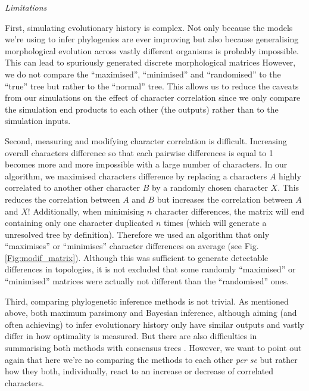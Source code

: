 \documentclass[12pt,letterpaper]{article}
\renewcommand{\subsection}[1]{%
\bigskip
\begin{center}
\begin{large}
\normalfont\itshape #1
\end{large}
\end{center}}
\begin{document}
\subsection{Limitations}
First, simulating evolutionary history is complex.
Not only because the models we're using to infer phylogenies are ever improving \citep[e.g.][]{heath2014fossilized,Wright01072016} but also because generalising morphological evolution across vastly different organisms is probably impossible.
This can lead to spuriously generated discrete morphological matrices
However, we do not compare the ``maximised'', ``minimised'' and ``randomised'' to the ``true'' tree but rather to the ``normal'' tree.
This allows us to reduce the caveats from our simulations on the effect of character correlation since we only compare the simulation end products to each other (the outputs) rather than to the simulation inputs.

Second, measuring and modifying character correlation is difficult. 
Increasing overall characters difference so that each pairwise differences is equal to 1 becomes more and more impossible with a large number of characters.
In our algorithm, we maximised characters difference by replacing a characters $A$ highly correlated to another other character $B$ by a randomly chosen character $X$.
This reduces the correlation between $A$ and $B$ but increases the correlation between $A$ and $X$!
Additionally, when minimising $n$ character differences, the matrix will end containing only one character duplicated $n$ times (which will generate a unresolved tree by definition).
Therefore we used an algorithm that only ``maximises'' or ``minimises'' character differences on average (see Fig. \ref{Fig:modif_matrix}).
Although this was sufficient to generate detectable differences in topologies, it is not excluded that some randomly ``maximised'' or ``minimised'' matrices were actually not different than the ``randomised'' ones.

Third, comparing phylogenetic inference methods is not trivial.
As mentioned above, both maximum parsimony and Bayesian inference, although aiming (and often achieving) to infer evolutionary history only have similar outputs and vastly differ in how optimality is measured.
But there are also difficulties in summarising both methods with consensus trees \cite{oReilly2017efficacy}.
However, we want to point out again that here we're no comparing the methods to each other \textit{per se} but rather how they both, individually, react to an increase or decrease of correlated characters.
\end{document}
